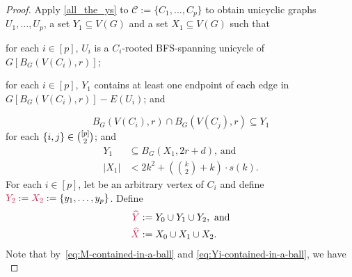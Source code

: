 \documentclass{patmorin}
\newcommand{\pat}[1]{\textcolor{Blue}{[Pat: #1]}}
\newcommand{\gwen}[1]{\textcolor{Purple}{Gwen: #1}}
\DeclarePairedDelimiter\set{\{}{\}}
\begin{document}
\begin{proof}
Apply \cref{all_the_ys} to $\mathcal{C}:=\{C_1,\ldots,C_p\}$ to obtain unicyclic graphs $U_1,\ldots,U_p$, a set
 $Y_1\subseteq V(G)$ and a set $X_1\subseteq V(G)$ such that 
    \begin{tightenum}%
      \item for each $i\in[p]$, $U_i$ is a  $C_i$-rooted BFS-spanning unicycle of $G[B_G(V(C_i),r)]$;
      \item for each $i\in[p]$, $Y_1$
      contains at least one endpoint of each edge in $G[B_G(V(C_i),r)]- E(U_i)$; and
\end{tightenum}
\begin{equation}
B_{G}(V(C_i),r)\cap B_{G}(V(C_j),r)\subseteq Y_1
\end{equation}
for each $\set{i,j}\in\binom{[p]}{2}$; and
\begin{align}
Y_1&\subseteq B_G(X_1,2r+d)\text{, and} \label{eq:Yi-contained-in-a-ball}\\
|X_1|&<\textstyle  2k^2+ (\binom{k}{2}+k)\cdot s(k). \label{eq:Xi-size}
\end{align}
For each $i\in[p]$, let  be an arbitrary vertex of $C_i$ and define $\mathdefin{Y_2}:=\mathdefin{X_2}:=\{y_1,\ldots,y_p\}$.
Define 
\begin{align*}
  \mathdefin{\widehat{Y}}&:= \textstyle Y_0 \cup Y_1 \cup Y_2,\ \textrm{and}\\
  \mathdefin{\widehat{X}}&:=\textstyle X_0\cup X_1\cup X_2.
\end{align*}
Note that by~\eqref{eq:M-contained-in-a-ball} and \eqref{eq:Yi-contained-in-a-ball}, we have
\begin{equation}\label{m_in_x_ball}

\end{equation}
\end{proof}
\end{document}
